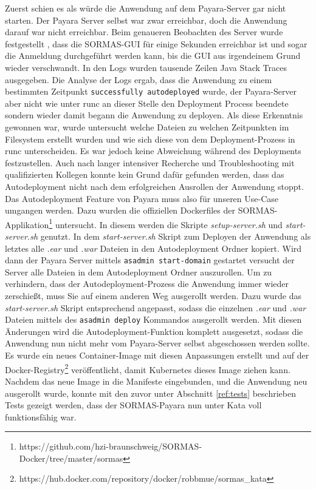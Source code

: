 Zuerst schien es als würde die Anwendung auf dem Payara-Server gar nicht starten. 
Der Payara Server selbst war zwar erreichbar, doch die Anwendung darauf war nicht erreichbar.
Beim genaueren Beobachten des Server wurde festgestellt , dass die \ac{SORMAS}-\ac{GUI} für einige Sekunden erreichbar ist und sogar die Anmeldung durchgeführt werden kann, bis die \ac{GUI} aus irgendeinem Grund wieder verschwandt.
In den Logs wurden tausende Zeilen Java Stack Traces ausgegeben.
Die Analyse der Logs ergab, dass die Anwendung zu einem bestimmten Zeitpunkt \texttt{successfully autodeployed} wurde, der Payara-Server aber nicht wie unter runc an dieser Stelle den Deployment Process beendete sondern wieder damit begann die Anwendung zu deployen.
Als diese Erkenntnis gewonnen war, wurde untersucht welche Dateien zu welchen Zeitpunkten im Filesystem erstellt wurden und wie sich diese von dem Deployment-Prozess in runc unterscheiden. 
Es war jedoch keine Abweichung während des Deployments festzustellen.
Auch nach langer intensiver Recherche und Troubleshooting mit qualifizierten Kollegen konnte kein Grund dafür gefunden werden, dass das Autodeployment nicht nach dem erfolgreichen Ausrollen der Anwendung stoppt. 
\\
Das Autodeployment Feature von Payara muss also für unseren Use-Case umgangen werden. 
Dazu wurden die offiziellen Dockerfiles der \ac{SORMAS}-Applikation\footnote{https://github.com/hzi-braunschweig/SORMAS-Docker/tree/master/sormas} untersucht. 
In diesem werden die Skripte \textit{setup-server.sh} und \textit{start-server.sh} genutzt.
In dem \textit{start-server.sh} Skript zum Deployen der Anwendung als letztes alle \textit{.ear} und \textit{.war} Dateien in den Autodeployment Ordner kopiert.
Wird dann der Payara Server mittels \texttt{asadmin start-domain} gestartet versucht der Server alle Dateien in dem Autodeployment Ordner auszurollen.
Um zu verhindern, dass der Autodeployment-Prozess die Anwendung immer wieder zerschießt, muss Sie auf einem anderen Weg ausgerollt werden.
Dazu wurde das \textit{start-server.sh} Skript entsprechend angepasst, sodass die einzelnen \textit{.ear} und \textit{.war} Dateien mittels des \texttt{asadmin deploy} Kommandos ausgerollt werden.
Mit diesen Änderungen wird die Autodeployment-Funktion komplett ausgesetzt, sodass die Anwendung nun nicht mehr vom Payara-Server selbst abgeschossen werden sollte.
Es wurde ein neues Container-Image mit diesen Anpassungen erstellt und auf der Docker-Registry\footnote{https://hub.docker.com/repository/docker/robbmue/sormas\_kata} veröffentlicht, damit Kubernetes dieses Image ziehen kann.
Nachdem das neue Image in die Manifeste eingebunden, und die Anwendung neu ausgerollt wurde, konnte mit den zuvor unter Abschnitt \ref{ref:tests} beschrieben Tests gezeigt werden, dass der \ac{SORMAS}-Payara nun unter Kata voll funktionsfähig war.


